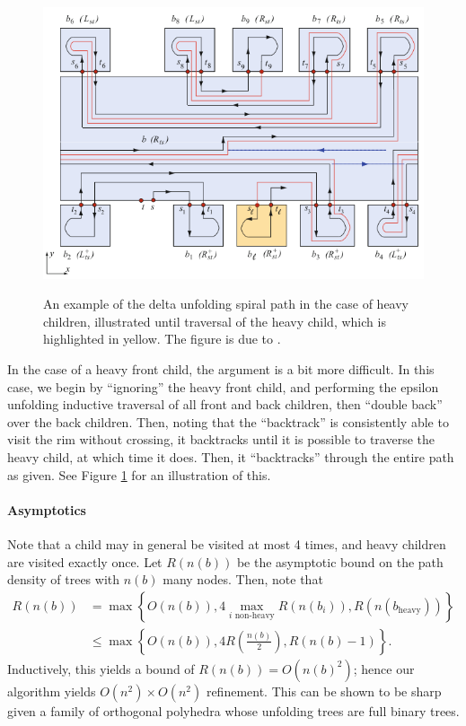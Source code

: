 \documentclass{article}
\begin{document}
\begin{figure}
  \begin{center}
    \includegraphics[width=.8\textwidth]{./figs/delta_unfolding_front.png}\\
  \end{center}
  \caption{
    An example of the delta unfolding spiral path in the case of heavy children, illustrated until traversal of the heavy child, which is highlighted in yellow.
    The figure is due to \cite[Fig. 9]{Damian_Demaine_Flatland}.
  }\label{Delta figure}
\end{figure}

In the case of a heavy front child, the argument is a bit more difficult.
In this case, we begin by ``ignoring'' the heavy front child, and performing the epsilon unfolding inductive traversal of all front and back children, then ``double back'' over the back children.
Then, noting that the ``backtrack'' is consistently able to visit the rim without crossing, it backtracks until it is possible to traverse the heavy child, at which time it does.
Then, it ``backtracks'' through the entire path as given.
See Figure \ref{Delta figure} for an illustration of this.

\paragraph{Asymptotics}
Note that a child may in general be visited at most 4 times, and heavy children are visited exactly once.
Let $R(n(b))$ be the asymptotic bound on the path density of trees with $n(b)$ many nodes.
Then, note that
\begin{align*}
   R(n(b))  
   &= \max \left\{ O(n(b)), 4 \max_{i \text{ non-heavy}} R(n(b_i)), R(n(b_{\text{heavy}}))\right\}\\
   &\leq \max \left\{ O(n(b)),4 R\left( \frac{n(b)}{2} \right), R(n(b) - 1)\right\}    .
\end{align*}
Inductively, this yields a bound of $R(n(b)) = O(n(b)^2)$;
hence our algorithm yields $O(n^2) \times O(n^2)$ refinement.
This can be shown to be sharp given a family of orthogonal polyhedra whose unfolding trees are full binary trees.
\end{document}
